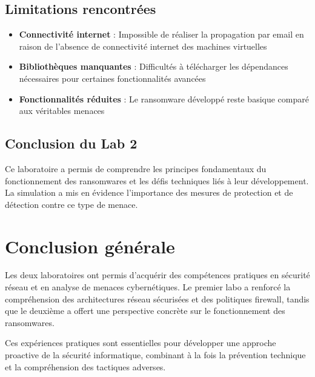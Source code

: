 \documentclass[12pt,a4paper]{article}
\begin{document}
	\subsection{Limitations rencontrées}
	\begin{itemize}
		\item \textbf{Connectivité internet} : Impossible de réaliser la propagation par email en raison de l'absence de connectivité internet des machines virtuelles
		\item \textbf{Bibliothèques manquantes} : Difficultés à télécharger les dépendances nécessaires pour certaines fonctionnalités avancées
		\item \textbf{Fonctionnalités réduites} : Le ransomware développé reste basique comparé aux véritables menaces
	\end{itemize}
	
	\subsection{Conclusion du Lab 2}
	Ce laboratoire a permis de comprendre les principes fondamentaux du fonctionnement des ransomwares et les défis techniques liés à leur développement. La simulation a mis en évidence l'importance des mesures de protection et de détection contre ce type de menace.
	
	\section{Conclusion générale}
	
	Les deux laboratoires ont permis d'acquérir des compétences pratiques en sécurité réseau et en analyse de menaces cybernétiques. Le premier labo a renforcé la compréhension des architectures réseau sécurisées et des politiques firewall, tandis que le deuxième a offert une perspective concrète sur le fonctionnement des ransomwares.
	
	Ces expériences pratiques sont essentielles pour développer une approche proactive de la sécurité informatique, combinant à la fois la prévention technique et la compréhension des tactiques adverses.
	
\end{document}
